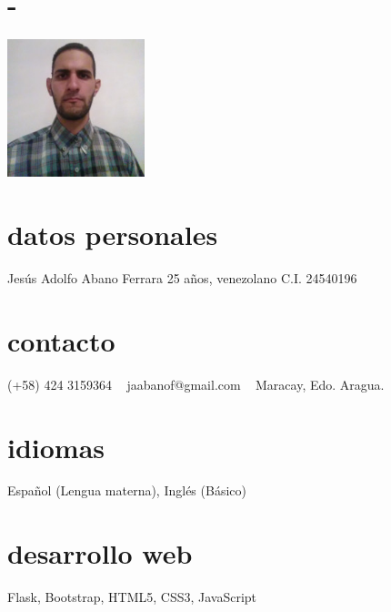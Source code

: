 \documentclass[espanol]{cv-style}     %
\begin{document}
\lastupdated

\begin{aside}
\section{-}
\includegraphics[width=4cm]{perfileLinkedin.jpeg}
%
\section{datos personales}
Jesús Adolfo Abano Ferrara
25 años, venezolano
C.I. 24540196
%
\section{contacto}
(+58) 424 3159364
~
jaabanof@gmail.com
~
Maracay, Edo. Aragua.
%
\section{idiomas}
Español (Lengua materna),
Inglés (Básico)
%
\section{desarrollo web}
Flask, Bootstrap, HTML5, CSS3, JavaScript
%
\end{aside}
\vspace{0.2cm}
\end{document}
